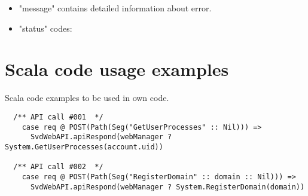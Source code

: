 \documentclass[11pt,a4paper]{scrartcl}
\begin{document}
  \begin{itemize}
    \item "message" contains detailed information about error.
    \item "status" codes:

  \end{itemize}


\section{Scala code usage examples}\label{sec:scalausage}
  Scala code examples to be used in own code.

  \begin{verbatim}
  /** API call #001  */
    case req @ POST(Path(Seg("GetUserProcesses" :: Nil))) =>
      SvdWebAPI.apiRespond(webManager ? System.GetUserProcesses(account.uid))

  /** API call #002  */
    case req @ POST(Path(Seg("RegisterDomain" :: domain :: Nil))) =>
      SvdWebAPI.apiRespond(webManager ? System.RegisterDomain(domain))

  \end{verbatim}
\end{document}
